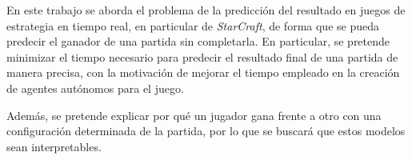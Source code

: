 En este trabajo se aborda el problema de la predicción del resultado en
juegos de estrategia en tiempo real, en particular de \emph{StarCraft}, de
forma que se pueda predecir el ganador de una partida sin completarla.
En particular, se pretende minimizar el tiempo necesario para predecir el
resultado final de una partida de manera precisa, con la motivación
de mejorar el tiempo empleado en la creación de agentes autónomos para el juego. %

Además, se pretende explicar
por qué un jugador gana frente a otro con una configuración determinada de la
partida, por lo que se buscará que estos modelos sean interpretables. %


